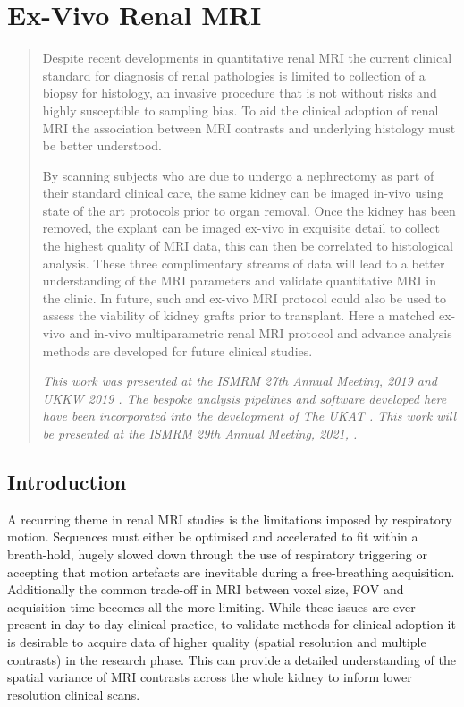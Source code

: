 \chapter{Ex-Vivo Renal MRI}
\label{chap:ex}
\newpage
\begin{abstract}
	Despite recent developments in quantitative renal \ac{MRI} the current clinical standard for diagnosis of renal pathologies is limited to collection of a  biopsy for histology, an invasive procedure that is not without risks and highly susceptible to sampling bias. To aid the clinical adoption of renal \ac{MRI} the association between \ac{MRI} contrasts and underlying histology must be better understood.	
	
	By scanning subjects who are due to undergo a nephrectomy as part of their standard clinical care, the same kidney can be imaged in-vivo using state of the art protocols prior to organ removal. Once the kidney has been removed, the explant can be imaged ex-vivo in exquisite detail to collect the highest quality of \ac{MRI} data, this can then be correlated to  histological analysis. These three complimentary streams of data will lead to a better understanding of the \ac{MRI} parameters and validate quantitative \ac{MRI} in the clinic. In future, such and ex-vivo \ac{MRI} protocol could also be used to assess the viability of kidney grafts prior to transplant. Here a matched ex-vivo and in-vivo multiparametric renal \ac{MRI} protocol and advance analysis methods are developed for future clinical studies.
	
	\textit{This work was presented at the \ac{ISMRM} 27th Annual Meeting, 2019 \cite{daniel_effects_2019} and \ac{UKKW} 2019 \cite{kazmi_determining_2019-1}. The bespoke analysis pipelines and software developed here have been incorporated into the development of The \ac{UKAT} \cite{nery_ukrin_2020}. This work will be presented at the \ac{ISMRM} 29th Annual Meeting, 2021, \cite{daniel_ukrin_2021}.}
\end{abstract}
\acresetall
\newpage
\section{Introduction}

A recurring theme in renal \ac{MRI} studies is the limitations imposed by respiratory motion. Sequences must either be optimised and accelerated to fit within a breath-hold, hugely slowed down through the use of respiratory triggering or accepting that motion artefacts are inevitable during a free-breathing acquisition. Additionally the common trade-off in \ac{MRI} between voxel size, \ac{FOV} and acquisition time becomes all the more limiting. While these issues are ever-present in day-to-day clinical practice, to validate methods for clinical adoption it is desirable to acquire data of higher quality (spatial resolution and multiple contrasts) in the research phase. This can provide a detailed understanding of the spatial variance of \ac{MRI} contrasts across the whole kidney to inform lower resolution clinical scans.

